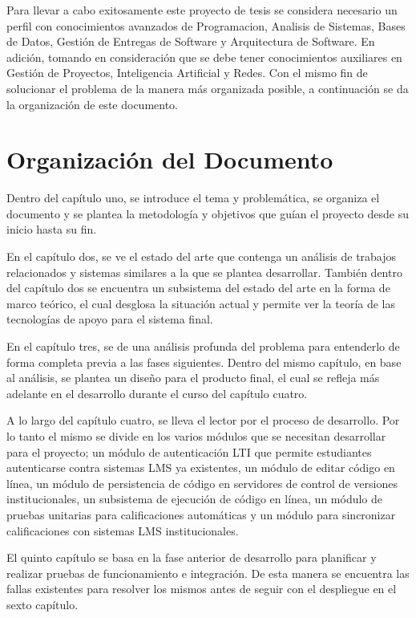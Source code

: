 Para llevar a cabo exitosamente este proyecto de tesis se considera necesario un perfil con conocimientos avanzados de Programacion, Analisis de Sistemas, Bases de Datos, Gestión de Entregas de Software y Arquitectura de Software. En adición, tomando en consideración que se debe tener conocimientos auxiliares en Gestión de Proyectos, Inteligencia Artificial y Redes. Con el mismo fin de solucionar el problema de la manera más organizada posible, a continuación se da la organización de este documento.

\section{Organización del Documento}
Dentro del capítulo uno, se introduce el tema y problemática, se organiza el documento y se plantea la metodología y objetivos que guían el proyecto desde su inicio hasta su fin.

En el capítulo dos, se ve el estado del arte que contenga un análisis de trabajos relacionados y sistemas similares a la que se plantea desarrollar. También dentro del capítulo dos se encuentra un subsistema del estado del arte en la forma de marco teórico, el cual desglosa la situación actual y permite ver la teoría de las tecnologías de apoyo para el sistema final.

En el capítulo tres, se de una análisis profunda del problema para entenderlo de forma completa previa a las fases siguientes. Dentro del mismo capítulo, en base al análisis, se plantea un diseño para el producto final, el cual se refleja más adelante en el desarrollo durante el curso del capítulo cuatro.

A lo largo del capítulo cuatro, se lleva el lector por el proceso de desarrollo. Por lo tanto el mismo se divide en los varios módulos que se necesitan desarrollar para el proyecto; un módulo de autenticación LTI que permite estudiantes autenticarse contra sistemas LMS ya existentes, un módulo de editar código en línea, un módulo de persistencia de código en servidores de control de versiones institucionales, un subsistema de ejecución de código en línea, un módulo de pruebas unitarias para calificaciones automáticas y un módulo para sincronizar calificaciones con sistemas LMS institucionales.

El quinto capítulo se basa en la fase anterior de desarrollo para planificar y realizar pruebas de funcionamiento e integración. De esta manera se encuentra las fallas existentes para resolver los mismos antes de seguir con el despliegue en el sexto capítulo.

